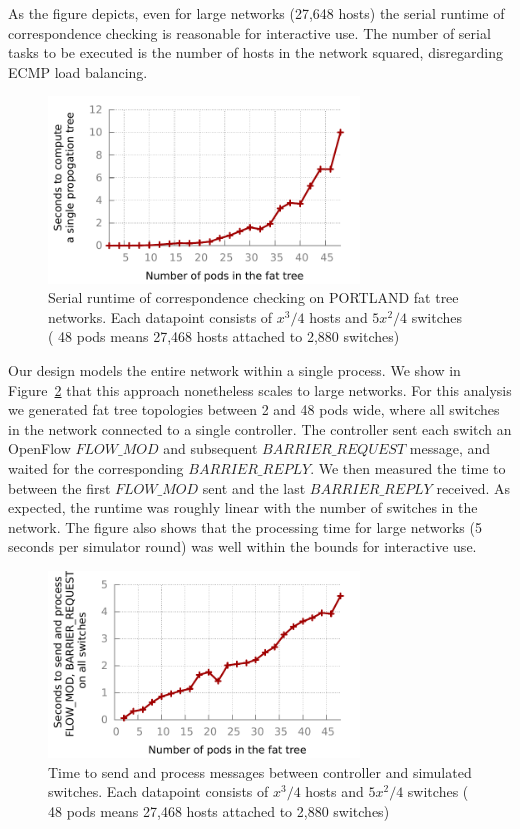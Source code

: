 As the figure depicts, even for large networks
(27,648 hosts) the serial runtime of correspondence checking is reasonable for
interactive use. The number of serial tasks to be executed
is the number of hosts in the network squared, disregarding ECMP load balancing.

\begin{figure}[t]
    \includegraphics[width=3.25in]{../graphs/hsa_overhead_graph/graph.pdf}
    \caption[]{\label{fig:hsa_runtime} Serial runtime of correspondence
    checking on PORTLAND fat tree networks. Each datapoint consists of
    $x^3/4$ hosts and $5x^2/4$ switches (\eg{} 48 pods means 27,468 hosts
    attached to 2,880 switches)}
\end{figure}

 Our design models the entire network
within a single process. We show in Figure~\ref{fig:scalability}
that this approach nonetheless scales to large networks. For this analysis we
generated fat tree topologies between 2 and 48 pods wide, where all switches in
the network connected to a single controller. The controller sent each switch
an OpenFlow 
$FLOW\_MOD$ and subsequent $BARRIER\_REQUEST$ message, and waited for the
corresponding $BARRIER\_REPLY$. We then measured the time to between the first
$FLOW\_MOD$ sent and the last $BARRIER\_REPLY$ received. As expected, the
runtime was roughly linear with the number of switches in the network. The
figure also shows that the processing time for large networks (5 seconds per
simulator round) was well within the bounds for interactive use.

\begin{figure}[t]
    \includegraphics[width=3.25in]{../graphs/scalability_graph/scale.pdf}
    \caption[]{\label{fig:scalability} Time to send and process messages
    between controller and simulated switches. Each datapoint consists of
    $x^3/4$ hosts and $5x^2/4$ switches (\eg{} 48 pods means 27,468 hosts
    attached to 2,880 switches)}
\end{figure}

